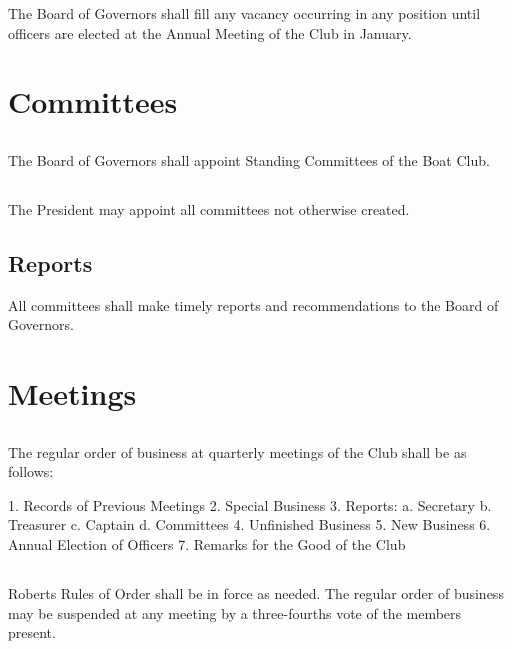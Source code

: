 \documentclass[11pt,american,letterpaper,]{constitution}
\begin{document}
The Board of Governors shall fill any vacancy occurring in any position until officers are elected at the Annual Meeting of the Club in January.

\section{Committees}

\subsection[Appointed by Board of Governors]{} 

The Board of Governors shall appoint Standing Committees of the Boat Club.

\subsection[Appointed by President]{} 

The President may appoint all committees not otherwise created.

\subsection{Reports} 

All committees shall make timely reports and recommendations to the Board of Governors.

\section{Meetings}

\subsection[Order of Business at Quarterly Meetings]{}

The regular order of business at quarterly meetings of the Club shall be as follows:

1. Records of Previous Meetings
2. Special Business
3. Reports:
	a. Secretary
	b. Treasurer
	c. Captain
	d. Committees
4. Unfinished Business
5. New Business
6. Annual Election of Officers
7. Remarks for the Good of the Club

\subsection[Roberts Rules]{} 

Roberts Rules of Order shall be in force as needed. The regular order of business may be suspended at any meeting by a three-fourths vote of the members present.
\end{document}
